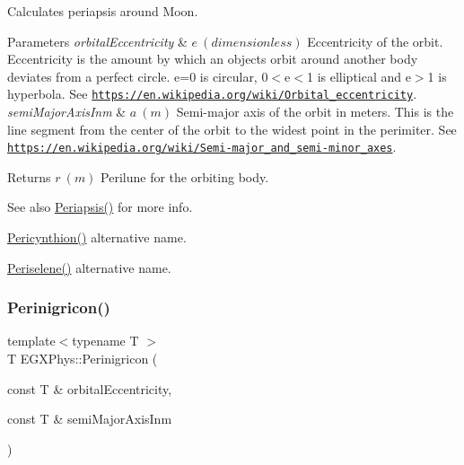 Calculates periapsis around Moon. 


\begin{DoxyParams}{Parameters}
{\em orbital\+Eccentricity} & $ e\ (dimensionless)$ Eccentricity of the orbit. Eccentricity is the amount by which an objects orbit around another body deviates from a perfect circle. e=0 is circular, 0$<$e$<$1 is elliptical and e$>$1 is hyperbola. See \href{https://en.wikipedia.org/wiki/Orbital_eccentricity}{\tt https\+://en.\+wikipedia.\+org/wiki/\+Orbital\+\_\+eccentricity}. \\
\hline
{\em semi\+Major\+Axis\+Inm} & $ a\ (m)$ Semi-\/major axis of the orbit in meters. This is the line segment from the center of the orbit to the widest point in the perimiter. See \href{https://en.wikipedia.org/wiki/Semi-major_and_semi-minor_axes}{\tt https\+://en.\+wikipedia.\+org/wiki/\+Semi-\/major\+\_\+and\+\_\+semi-\/minor\+\_\+axes}. \\
\hline
\end{DoxyParams}
\begin{DoxyReturn}{Returns}
$ r\ (m)$ Perilune for the orbiting body. 
\end{DoxyReturn}
\begin{DoxySeeAlso}{See also}
\mbox{\hyperlink{group___e_g_x_phys-_periapsis_gad487212733711bc2ce73c8137c9309c3}{Periapsis()}} for more info. 

\mbox{\hyperlink{group___e_g_x_phys-_periapsis_ga101f47cc9ce1eb98aeec35fa5c9ba9e4}{Pericynthion()}} alternative name. 

\mbox{\hyperlink{group___e_g_x_phys-_periapsis_ga91c6e1f3b6f98fe053bec87efcff4364}{Periselene()}} alternative name. 
\end{DoxySeeAlso}
\mbox{\label{group___e_g_x_phys-_periapsis_ga2de34009308e46d1d3bd4eb8cd4b0a8d}} 
\subsubsection{\texorpdfstring{Perinigricon()}{Perinigricon()}}
{\footnotesize\ttfamily template$<$typename T $>$ \\
T E\+G\+X\+Phys\+::\+Perinigricon (\begin{DoxyParamCaption}\item[{const T \&}]{orbital\+Eccentricity,  }\item[{const T \&}]{semi\+Major\+Axis\+Inm }\end{DoxyParamCaption})}



